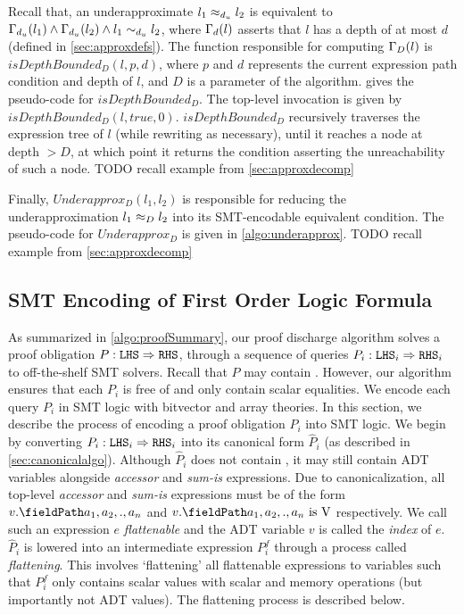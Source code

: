 

Recall that, an underapproximate \recursiveRelation{} $l_1 \approx_{d_u} l_2$
is equivalent to $\Gamma_{d_u}(l_1) \land \Gamma_{d_u}(l_2) \land l_1 \sim_{d_u} l_2$,
where $\Gamma_{d}(l)$ asserts that $l$ has a depth of at most $d$ (defined in \cref{sec:approxdefs}).
The function responsible for computing $\Gamma_{D}(l)$ is $isDepthBounded_D(l,p,d)$,
where $p$ and $d$ represents the current expression path condition and depth of $l$,
and $D$ is a parameter of the algorithm.
 gives the pseudo-code for $isDepthBounded_D$.
The top-level invocation is given by $isDepthBounded_D(l,true,0)$.
$isDepthBounded_D$ recursively traverses the expression tree of $l$ (while rewriting as necessary),
until it reaches a node at depth $>D$, at which point it returns the condition asserting the unreachability
of such a node. TODO recall example from \cref{sec:approxdecomp}



Finally, $Underapprox_D(l_1,l_2)$ is responsible for reducing the underapproximation $l_1 \approx_{D} l_2$
into its SMT-encodable equivalent condition.
The pseudo-code for $Underapprox_D$ is given in \cref{algo:underapprox}.
TODO recall example from \cref{sec:approxdecomp}

\subsection{SMT Encoding of First Order Logic Formula}
\label{sec:smtencoding}
As summarized in \cref{algo:proofSummary}, our proof discharge algorithm solves a proof obligation $P: {\tt LHS}{} \Rightarrow {\tt RHS}{}$,
through a sequence of queries $P_i : {\tt LHS}{}_i \Rightarrow {\tt RHS}{}_i$ to off-the-shelf SMT solvers.
Recall that $P$ may contain \recursiveRelations{}.
However, our algorithm ensures that each $P_i$ is free of \recursiveRelations{} and only contain
scalar equalities.
We encode each query $P_i$ in SMT logic with bitvector and array theories.
In this section, we describe the process of encoding a proof obligation $P_i$ into SMT logic.
We begin by converting $P_i : {\tt LHS}{}_i \Rightarrow {\tt RHS}{}_i$ into its canonical form $\hat{P}_i$
(as described in \cref{sec:canonicalalgo}).
Although $\hat{P}_i$ does not contain \recursiveRelations{}, it may still contain
ADT variables alongside {\em accessor} and {\em sum-is} expressions.
Due to canonicalization, all top-level {\em accessor} and {\em sum-is} expressions must be of the form
$\prodAccess{v}{a_1,a_2,.,a_n}$ and $\sumIs{\prodAccess{v}{a_1,a_2,.,a_n}}{\textnormal{V}}$ respectively.
We call such an expression $e$ {\em flattenable} and the ADT variable $v$ is called the {\em index} of $e$.
$\hat{P}_i$ is lowered into an intermediate expression $P_i^f$ through a process called {\em flattening}.
This involves `flattening' all flattenable expressions to variables such that
$P_i^f$ only contains scalar values with scalar and memory operations (but importantly not ADT values).
The flattening process is described below.


